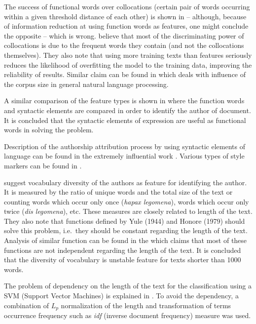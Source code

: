 \documentclass[11pt,english]{article}
\begin{document}
\begin{multicols}{2}
The success of functional words over collocations (certain pair of words
occurring within a given threshold distance of each other) is shown in
\citep{argamon2005measuring} -- although, because of information reduction at
using function words as features, one might conclude the opposite -- which is
wrong. \citet{argamon2005measuring} believe that most of the discriminating power
of collocations is due to the frequent words they contain (and not the
collocations themselves). They also note that using more training texts than
features seriously reduces the likelihood of overfitting the model to the
training data, improving the reliability of results. Similar claim can be found
in \citep{banko2001scaling} which deals with influence of the corpus size in
general natural language processing.

A similar comparison of the feature types is shown in
\citep{uzuner2005comparative} where the function words and syntactic
elements are compared in order to identify the author of document. It is
concluded that the syntactic elements of expression are useful as functional words in solving the
problem.

Description of the authorship attribution process by using syntactic elements
of language can be found in the extremely influential work
\citep{stamatatos2001computer}. Various types of style markers can be found in
\citep{luyckx2005shallow}.

\citet{stamatatos2001computer} suggest vocabulary diversity of the authors as
feature for identifying the author. It is measured by the ratio of unique words
and the total size of the text or counting words which occur only once
(\emph{hapax legomena}), words which occur only twice (\emph{dis legomena}), etc.
These measures are closely related to length of the text. They also note that
functions defined by Yule (1944) and Honore (1979) should solve this problem,
i.e.\ they should be constant regarding the length of the text. Analysis of
similar function can be found in the \citep{tweedie1998variable} which claims
that most of these functions are not independent regarding the length of the
text. It is concluded that the diversity of vocabulary is unstable feature for
texts shorter than 1000 words.

The problem of dependency on the length of the text for the classification using
a SVM (Support Vector Machines) is explained in \citep{diederich2003authorship}.
To avoid the dependency, a combination of $L_p$ normalization of the
length and transformation of terms occurrence frequency such as \emph{idf}
(inverse document frequency) measure was used.


\end{multicols}
\end{document}
